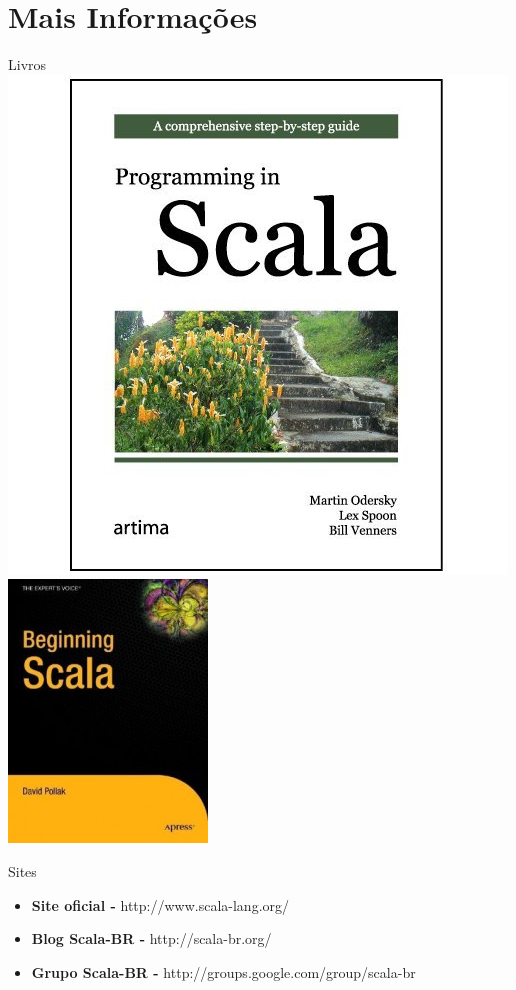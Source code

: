 \section{Mais Informações}

\begin{frame}{Livros}
	\includegraphics[scale=0.3]{progInScala.jpg}
	\includegraphics[scale=0.4]{beginning-scala.jpg}
\end{frame}

\begin{frame}{Sites}
	\begin{block}{ }
		\begin{itemize}
			\item \textbf{Site oficial -} http://www.scala-lang.org/
			\item \textbf{Blog Scala-BR -} http://scala-br.org/
			\item \textbf{Grupo Scala-BR -} http://groups.google.com/group/scala-br 
		\end{itemize}
	\end{block}
\end{frame}